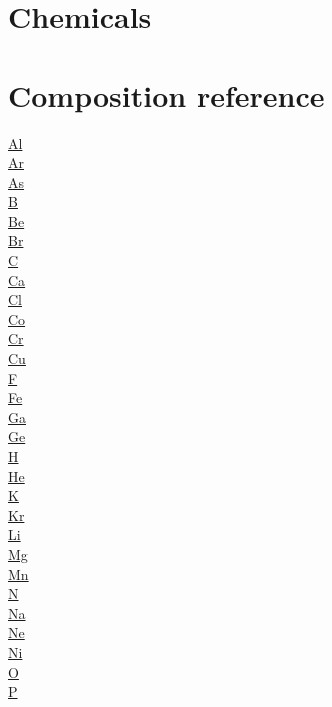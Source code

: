 \documentclass{book}
\begin{document}
\chapter{Chemicals}

\chapter{Composition reference}
\begin{multicols}{3}
\noindent
\hyperref[sec:elem-aluminium]{Al}\\
\hyperref[sec:elem-argon]{Ar}\\
\hyperref[sec:elem-arsenic]{As}\\
\hyperref[sec:elem-boron]{B}\\
\hyperref[sec:elem-beryllium]{Be}\\
\hyperref[sec:elem-bromine]{Br}\\
\hyperref[sec:elem-carbon]{C}\\
\hyperref[sec:elem-calcium]{Ca}\\
\hyperref[sec:elem-chlorine]{Cl}\\
\hyperref[sec:elem-cobalt]{Co}\\
\hyperref[sec:elem-chromium]{Cr}\\
\hyperref[sec:elem-copper]{Cu}\\
\hyperref[sec:elem-fluorine]{F}\\
\hyperref[sec:elem-iron]{Fe}\\
\hyperref[sec:elem-gallium]{Ga}\\
\hyperref[sec:elem-germanium]{Ge}\\
\hyperref[sec:elem-hydrogen]{H}\\
\hyperref[sec:elem-helium]{He}\\
\hyperref[sec:elem-potassium]{K}\\
\hyperref[sec:elem-krypton]{Kr}\\
\hyperref[sec:elem-lithium]{Li}\\
\hyperref[sec:elem-magnesium]{Mg}\\
\hyperref[sec:elem-manganese]{Mn}\\
\hyperref[sec:elem-nitrogen]{N}\\
\hyperref[sec:elem-sodium]{Na}\\
\hyperref[sec:elem-neon]{Ne}\\
\hyperref[sec:elem-nickel]{Ni}\\
\hyperref[sec:elem-oxygen]{O}\\
\hyperref[sec:elem-phosphorus]{P}\\

\end{multicols}
\end{document}
